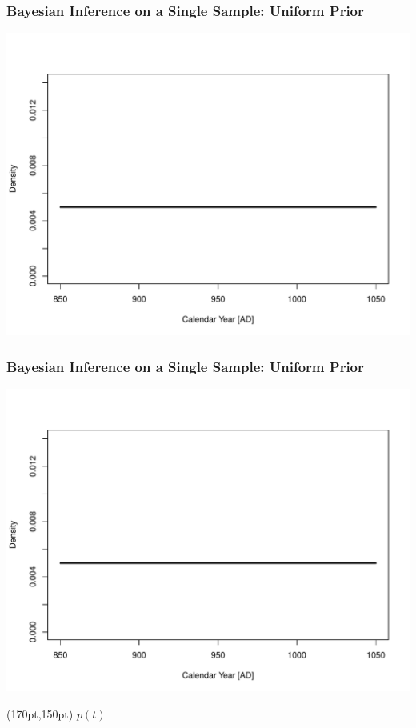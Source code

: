 \documentclass{beamer}
\begin{document}
\begin{frame}[t]
  \frametitle{Bayesian Inference on a Single Sample: Uniform Prior}
    \begin{center}
      \includegraphics[height=.8\textheight]{single_obs_inf_plot1.pdf}
    \end{center}
\end{frame}

\begin{frame}[t]
  \frametitle{Bayesian Inference on a Single Sample: Uniform Prior}
    \begin{center}
      \includegraphics[height=.8\textheight]{single_obs_inf_plot1.pdf}
    \end{center}
    \begin{textblock*}{100pt}(170pt,150pt)
      \Large $p(t)$ \normalsize
	\end{textblock*}
\end{frame}
\end{document}
